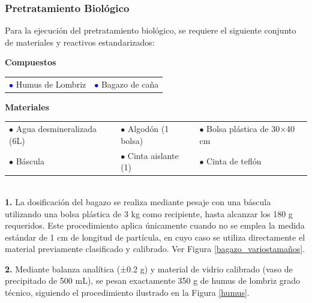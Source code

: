 \documentclass[12pt]{article}
\begin{document}
			\subsubsection{Pretratamiento Biológico}
	
			
		Para la ejecución del pretratamiento biológico, se requiere el siguiente conjunto de materiales y reactivos estandarizados:
			
			\textbf{Compuestos} 
			

				\begin{tabular}{p{0.3\textwidth}p{}}
				\textcolor{blue}{$\bullet$} Humus de Lombriz  &	\textcolor{blue}{$\bullet$} Bagazo de caña
			\end{tabular}
			
			\textbf{Materiales} 
	
			\begin{tabular}{p{}p{}p{}}
				$\bullet$ Agua desmineralizada (6L) & $\bullet$ Algodón (1 bolsa) & $\bullet$ Bolsa plástica de 30×40 cm \\
				$\bullet$ Báscula & $\bullet$ Cinta aislante (1) & $\bullet$ Cinta de teflón
			\end{tabular}
			\\
			
			
			\textbf{1.}	La dosificación del bagazo se realiza mediante pesaje con una báscula utilizando una bolsa plástica de 3 kg como recipiente, hasta alcanzar los 180 g requeridos. Este procedimiento aplica únicamente cuando no se emplea la medida estándar de 1 cm de longitud de partícula, en cuyo caso se utiliza directamente el material previamente clasificado y calibrado. Ver Figura \ref{bagazo_variostamaños}.
		
			
			\textbf{2.}	Mediante balanza analítica (±0.2 g) y material de vidrio calibrado (vaso de precipitado de 500 mL), se pesan exactamente 350 g de humus de lombriz grado técnico, siguiendo el procedimiento ilustrado en la Figura \ref{humus}.
			
\end{document}
